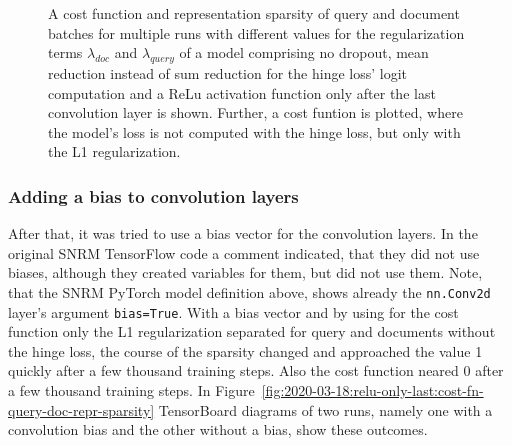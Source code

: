 \begin{figure}[htbp]
\caption[Cost functions and sparsity of multiple runs with different values of the regularization terms $\lambda_{doc}$ and $\lambda_{query}$ of a model comprising sum reduction for hinge loss' logits computation, no dropout and ReLu only after the last layer; Cost function where the model's loss is not computed with the hinge loss, but only with the L1 regularization]{A cost function and representation sparsity of query and document batches for multiple runs with different values for the regularization terms $\lambda_{doc}$ and $\lambda_{query}$ of a model comprising no dropout, mean reduction instead of sum reduction for the hinge loss' logit computation and a ReLu activation function only after the last convolution layer is shown. Further, a cost funtion is plotted, where the model's loss is not computed with the hinge loss, but only with the L1 regularization.}
\label{fig:2020-03-15:cost-fn-query-doc-repr-sparsity} %
\end{figure}

\subsubsection*{Adding a bias to convolution layers}
After that, it was tried to use a bias vector for the convolution layers.
In the original SNRM TensorFlow code a comment indicated, that they did not use biases,
    although they created variables for them, but did not use them.
Note, that the SNRM PyTorch model definition above, shows already the \texttt{nn.Conv2d} 
    layer's argument \texttt{bias=True}.
With a bias vector and by using for the cost function only the L1 regularization separated 
    for query and documents without the hinge loss,
    the course of the sparsity changed and approached the value 1 quickly after a few thousand 
    training steps.
Also the cost function neared 0 after a few thousand training steps.
In Figure~\ref{fig:2020-03-18:relu-only-last:cost-fn-query-doc-repr-sparsity}
    TensorBoard diagrams of two runs, namely one with a convolution bias
    and the other without a bias, show these outcomes.

